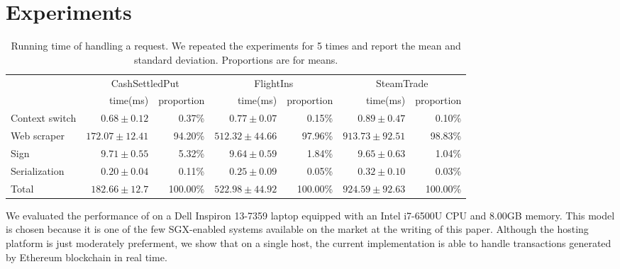 \section{Experiments}
\label{sec:experiments}

\begin{table*}[ht]
\centering
\begin{tabular}{lrr|rr|rr}
\toprule
& \multicolumn{2}{c|}{\sf CashSettledPut} &
  \multicolumn{2}{c|}{\sf FlightIns} &
  \multicolumn{2}{c}{\sf SteamTrade} \\
  & time(ms) & proportion & time(ms) & proportion  & time(ms) & proportion\\
\midrule
Context switch      & $0.68\pm 0.12$    & 0.37\%   
                    & $0.77\pm 0.07$    & 0.15\%    
                    & $0.89\pm 0.47$    & 0.10\%\\
%
Web scraper         & $172.07\pm 12.41$  & 94.20\%  
                    & $512.32\pm 44.66$  & 97.96\%   
                    & $913.73\pm 92.51$  & 98.83\%\\
%
Sign                & $9.71\pm 0.55$   & 5.32\%   
                    & $9.64\pm 0.59$   & 1.84\%    
                    & $9.65\pm 0.63$   & 1.04\%\\
%
Serialization       & $0.20\pm 0.04$    & 0.11\%   
                    & $0.25\pm 0.09$    & 0.05\%    
                    & $0.32\pm 0.10$    & 0.03\%\\
\midrule
Total               & $182.66\pm 12.7$  & 100.00\%    
                    & $522.98\pm 44.92$ & 100.00\% 
                    & $924.59\pm 92.63$ & 100.00\%\\
\bottomrule
\end{tabular}
\caption{Running time of handling a request. We repeated the experiments for 5 times and
report the mean and standard deviation. Proportions are for means.}
\label{tab:eval_profiling}
\end{table*}

We evaluated the performance of \tc on a Dell Inspiron 13-7359 laptop equipped
with an Intel i7-6500U CPU and 8.00GB memory.  This model is chosen 
because it is one of the few SGX-enabled systems available on the market at the
writing of this paper. Although the hosting platform is just moderately preferment, we
show that on a single host, the current implementation is able to handle 
transactions generated by Ethereum blockchain in real time. 


